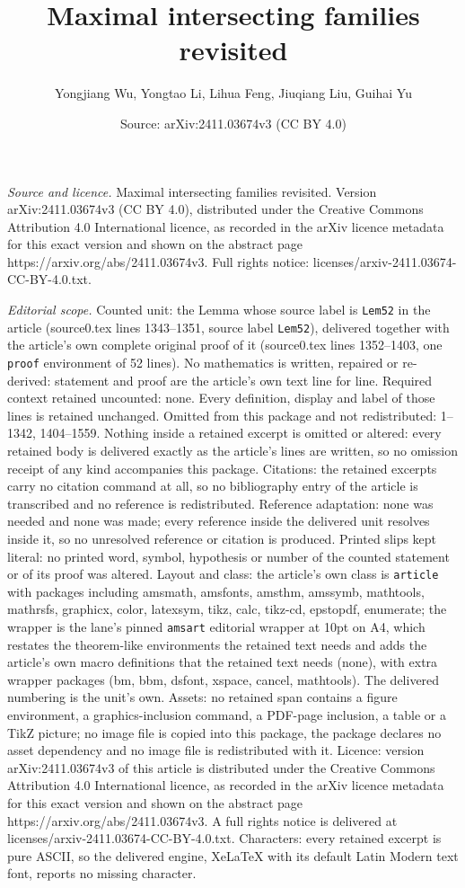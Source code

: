 \documentclass[10pt,a4paper]{amsart}
\title[Maximal intersecting families revisited]{Maximal intersecting families revisited}
\author{Yongjiang Wu, Yongtao Li, Lihua Feng, Jiuqiang Liu, Guihai Yu}
\date{Source: arXiv:2411.03674v3 (CC BY 4.0)}
\begin{document}
\maketitle

\noindent\emph{Source and licence.} Maximal intersecting families revisited. Version arXiv:2411.03674v3 (CC BY 4.0), distributed under the Creative Commons Attribution 4.0 International licence, as recorded in the arXiv licence metadata for this exact version and shown on the abstract page https://arxiv.org/abs/2411.03674v3. Full rights notice: licenses/arxiv-2411.03674-CC-BY-4.0.txt.\par\smallskip

\noindent\textit{Editorial scope.} Counted unit: the Lemma whose source label is \texttt{Lem52} in the article (source0.tex lines 1343--1351, source label \texttt{Lem52}), delivered together with the article's own complete original proof of it (source0.tex lines 1352--1403, one \texttt{proof} environment of 52 lines). No mathematics is written, repaired or re-derived: statement and proof are the article's own text line for line. Required context retained uncounted: none. Every definition, display and label of those lines is retained unchanged. Omitted from this package and not redistributed: 1--1342, 1404--1559. Nothing inside a retained excerpt is omitted or altered: every retained body is delivered exactly as the article's lines are written, so no omission receipt of any kind accompanies this package. Citations: the retained excerpts carry no citation command at all, so no bibliography entry of the article is transcribed and no reference is redistributed. Reference adaptation: none was needed and none was made; every reference inside the delivered unit resolves inside it, so no unresolved reference or citation is produced. Printed slips kept literal: no printed word, symbol, hypothesis or number of the counted statement or of its proof was altered. Layout and class: the article's own class is \texttt{article} with packages including amsmath, amsfonts, amsthm, amssymb, mathtools, mathrsfs, graphicx, color, latexsym, tikz, calc, tikz-cd, epstopdf, enumerate; the wrapper is the lane's pinned \texttt{amsart} editorial wrapper at 10pt on A4, which restates the theorem-like environments the retained text needs and adds the article's own macro definitions that the retained text needs (none), with extra wrapper packages (bm, bbm, dsfont, xspace, cancel, mathtools). The delivered numbering is the unit's own. Assets: no retained span contains a figure environment, a graphics-inclusion command, a PDF-page inclusion, a table or a TikZ picture; no image file is copied into this package, the package declares no asset dependency and no image file is redistributed with it. Licence: version arXiv:2411.03674v3 of this article is distributed under the Creative Commons Attribution 4.0 International licence, as recorded in the arXiv licence metadata for this exact version and shown on the abstract page https://arxiv.org/abs/2411.03674v3. A full rights notice is delivered at licenses/arxiv-2411.03674-CC-BY-4.0.txt. Characters: every retained excerpt is pure ASCII, so the delivered engine, XeLaTeX with its default Latin Modern text font, reports no missing character.
\end{document}
